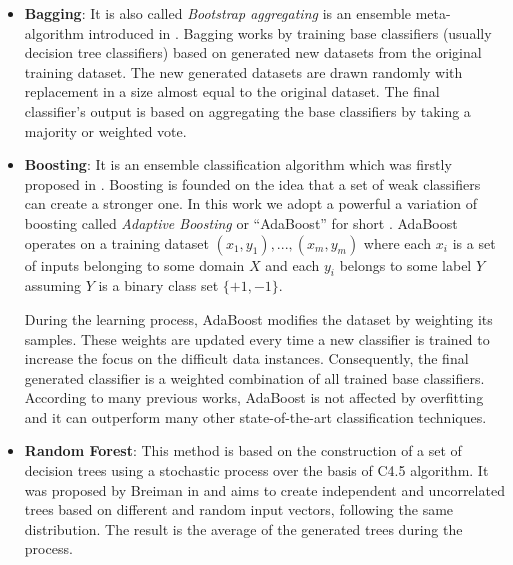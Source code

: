 \documentclass[a4paper,10pt,onecolumn,preprint,3p]{elsarticle}
\begin{document}
\begin{itemize}
\item \textbf{Bagging}: 
It is also called \textit{Bootstrap aggregating} is an ensemble meta-algorithm introduced in \cite{B1996}. Bagging works by training base classifiers (usually decision tree classifiers) based on generated new datasets from the original training dataset. The new generated datasets are drawn randomly with replacement in a size almost equal to the original dataset. 
The final classifier's output is based on aggregating the base classifiers by taking a majority or weighted vote.


\item \textbf{Boosting}: 
It is an ensemble classification algorithm which was firstly proposed in \cite{schapire1990strength}. Boosting is founded on the idea that a set of weak classifiers can create a stronger one. In this work we adopt a powerful a variation of boosting called \textit{Adaptive Boosting} or ``AdaBoost'' for short \cite{FS1997}. AdaBoost operates on a training dataset ${(x_{1},y_{1}),...,(x_{m},y_{m})}$ where each $x_{i}$ is a set of inputs belonging to some domain $X$ and each $y_{i}$ belongs to some label $Y$ assuming $Y$ is a binary class set $\{+1,-1\}$. 


During the learning process, AdaBoost modifies the dataset by weighting its samples. These weights are updated every time a new classifier is trained to increase the focus 
on the difficult data instances. Consequently, the final generated classifier is a weighted combination of all trained base classifiers. According to many previous works, 
AdaBoost is not affected 
by overfitting and it can outperform many other state-of-the-art classification techniques.


\item \textbf{Random Forest}:
This method is based on the construction of a set of decision trees using a stochastic process over the basis of C4.5 algorithm. It was proposed by Breiman in \cite{Breiman2001} and aims to create independent and uncorrelated trees based on different and random input vectors, following the same distribution. 
The result is the average of the generated trees during the process.


\end{itemize}
\end{document}

